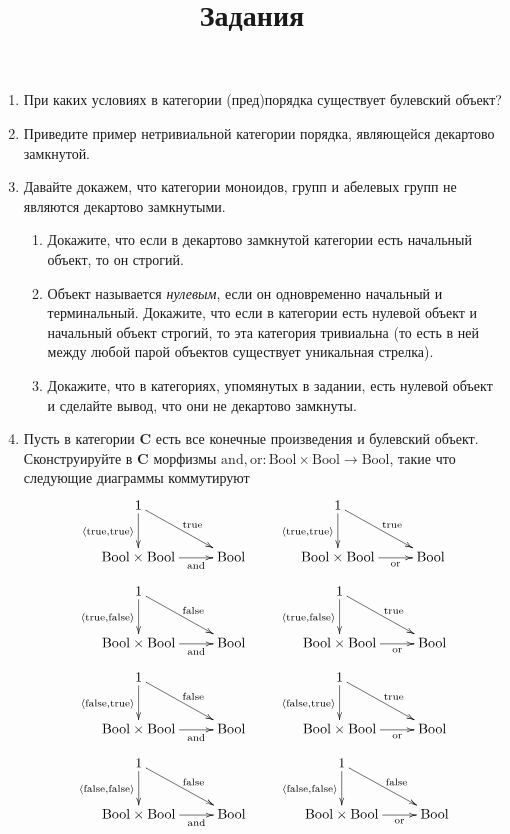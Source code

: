 \documentclass[draft]{article}
\newcommand{\cat}[1]{\mathbf{#1}}
\renewcommand{\C}{\cat{C}}
\newcommand{\bool}{\mathrm{Bool}}
\newcommand{\true}{\mathrm{true}}
\newcommand{\false}{\mathrm{false}}
\newcommand{\andb}{\mathrm{and}}
\newcommand{\orb}{\mathrm{or}}
\begin{document}
\title{Задания}
\maketitle

\begin{enumerate}

\item При каких условиях в категории (пред)порядка существует булевский объект?

\item Приведите пример нетривиальной категории порядка, являющейся декартово замкнутой.

\item Давайте докажем, что категории моноидов, групп и абелевых групп не являются декартово замкнутыми.
\begin{enumerate}
\item Докажите, что если в декартово замкнутой категории есть начальный объект, то он строгий.
\item Объект называется \emph{нулевым}, если он одновременно начальный и терминальный.
Докажите, что если в категории есть нулевой объект и начальный объект строгий, то эта категория тривиальна (то есть в ней между любой парой объектов существует уникальная стрелка).
\item Докажите, что в категориях, упомянутых в задании, есть нулевой объект и сделайте вывод, что они не декартово замкнуты.
\end{enumerate}

\item Пусть в категории $\C$ есть все конечные произведения и булевский объект.
Сконструируйте в $\C$ морфизмы $\andb, \orb : \bool \times \bool \to \bool$, такие что следующие диаграммы коммутируют
\[ \xymatrix{ 1 \ar[d]_{\langle \true, \true \rangle} \ar[rd]^{\true} \\
              \bool \times \bool \ar[r]_-{\andb} & \bool
            }
\qquad \xymatrix{ 1 \ar[d]_{\langle \true, \true \rangle} \ar[rd]^{\true} \\
              \bool \times \bool \ar[r]_-{\orb} & \bool
            } \]
\[ \xymatrix{ 1 \ar[d]_{\langle \true, \false \rangle} \ar[rd]^{\false} \\
              \bool \times \bool \ar[r]_-{\andb} & \bool
            }
\qquad \xymatrix{ 1 \ar[d]_{\langle \true, \false \rangle} \ar[rd]^{\true} \\
              \bool \times \bool \ar[r]_-{\orb} & \bool
            } \]
\[ \xymatrix{ 1 \ar[d]_{\langle \false, \true \rangle} \ar[rd]^{\false} \\
              \bool \times \bool \ar[r]_-{\andb} & \bool
            }
\qquad \xymatrix{ 1 \ar[d]_{\langle \false, \true \rangle} \ar[rd]^{\true} \\
              \bool \times \bool \ar[r]_-{\orb} & \bool
            } \]
\[ \xymatrix{ 1 \ar[d]_{\langle \false, \false \rangle} \ar[rd]^{\false} \\
              \bool \times \bool \ar[r]_-{\andb} & \bool
            }
\qquad \xymatrix{ 1 \ar[d]_{\langle \false, \false \rangle} \ar[rd]^{\false} \\
              \bool \times \bool \ar[r]_-{\orb} & \bool
            } \]


\end{enumerate}
\end{document}

